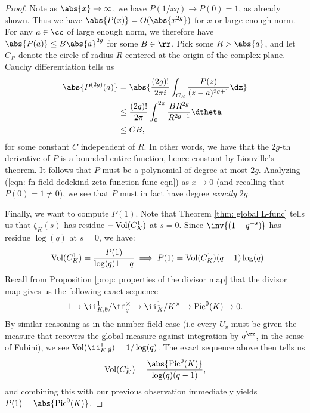 \documentclass[11pt, x11names, openany]{book}
\begin{document}
\begin{proof}
Note as $\abs{x} \to \infty$, we have $P(1/xq) \to P(0) = 1$, as already shown. Thus we have $\abs{P(x)} = O(\abs{x^{2g}})$ for $x$ or large enough norm. For any $a \in \cc$ of large enough norm, we therefore have $\abs{P(a)} \leq B \abs{a}^{2g}$ for some $B \in \rr$. Pick some $R > \abs{a}$, and let $C_R$ denote the circle of radius $R$ centered at the origin of the complex plane. Cauchy differentiation tells us
\begin{align*}
    \abs{P^{(2g)}(a)} &= \abs{\frac{(2g)!}{2 \pi i} \int_{C_R} \frac{P(z)}{(z-a)^{2g+1}} \dz}\\
    &\leq \frac{(2g)!}{2 \pi} \int^{2\pi}_0 \frac{BR^{2g}}{R^{2g + 1}} \dtheta \\
    & \leq C B,
\end{align*}
for some constant $C$ independent of $R$. In other words, we have that the $2g$-th derivative of $P$ is a bounded entire function, hence constant by Liouville's theorem. It follows that $P$ must be a polynomial of degree at most $2g$. Analyzing (\ref{eqn: fn field dedekind zeta function func eqn}) as $x \to 0$ (and recalling that $P(0) = 1 \neq 0$), we see that $P$ must in fact have degree \textit{exactly} $2g$.

Finally, we want to compute $P(1)$. Note that Theorem \ref{thm: global L-func} tells us that $\zeta_K(s)$ has residue $- \operatorname{Vol}(C^1_K)$ at $s = 0$. Since $\inv{(1 - q^{-s})}$ has residue $\log(q)$ at $ s= 0$, we have: 
\begin{equation*}
    - \operatorname{Vol}(C^1_K) = \frac{P(1)}{\log(q) 1-q} \implies P(1) = \operatorname{Vol}(C^1_K)(q-1) \log(q).
\end{equation*}
Recall from Proposition \ref{prop: properties of the divisor map} that the divisor map gives us the following exact sequence
\begin{equation*}
    1 \to \ii^1_{K, \emptyset}/\ff_q^\times \to \ii^1_K/K^\times \to \pic^0(K) \to 0. 
\end{equation*}
By similar reasoning as in the number field case (i.e every $U_v$ must be given the measure that recovers the global measure against integration by $q^\zz$, in the sense of Fubini), we see $\vol(\ii^1_{K, \emptyset}) = 1/\log(q)$. The exact sequence above then tells us
\begin{equation*}
    \vol(C^1_K) = \frac{\abs{\pic^0(K)}}{\log(q)(q-1)},
\end{equation*}
and combining this with our previous observation immediately yields $P(1) = \abs{\pic^0(K)}$.
\end{proof}
\end{document}
